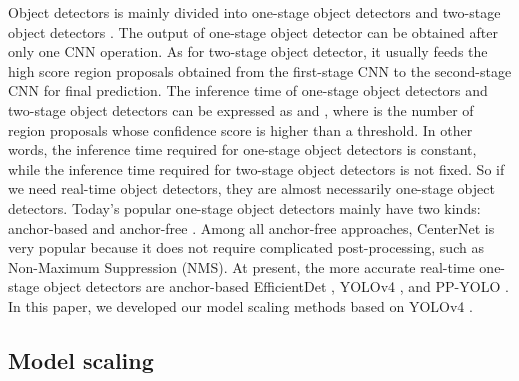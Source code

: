\documentclass[10pt,twocolumn,letterpaper]{article}
\begin{document}
Object detectors is mainly divided into one-stage object detectors \cite{redmon2016you, redmon2017yolo9000, redmon2018yolov3, liu2016ssd, lin2017focal, qiao2020detectors} and two-stage object detectors \cite{girshick2014rich, girshick2015fast, ren2015faster}.  The output of one-stage object detector can be obtained after only one CNN operation.  As for two-stage object detector, it usually feeds the high score region proposals obtained from the first-stage CNN to the second-stage CNN for final prediction.  The inference time of one-stage object detectors and two-stage object detectors can be expressed as  and , where  is the number of region proposals whose confidence score is higher than a threshold.  In other words, the inference time required for one-stage object detectors is constant, while the inference time required for two-stage object detectors is not fixed.  So if we need real-time object detectors, they are almost necessarily one-stage object detectors.  Today’s popular one-stage object detectors mainly have two kinds: anchor-based \cite{redmon2018yolov3, lin2017focal} and anchor-free \cite{duan2019centernet, law2018cornernet, law2019cornernet, tian2019fcos}.  Among all anchor-free approaches, CenterNet \cite{zhou2019objects} is very popular because it does not require complicated post-processing, such as Non-Maximum Suppression (NMS).  At present, the more accurate real-time one-stage object detectors are anchor-based EfficientDet \cite{tan2019efficientdet}, YOLOv4 \cite{bochkovskiy2020yolov4}, and PP-YOLO \cite{long2020pp}.  In this paper, we developed our model scaling methods based on YOLOv4 \cite{bochkovskiy2020yolov4}.

\subsection{Model scaling}
\end{document}
